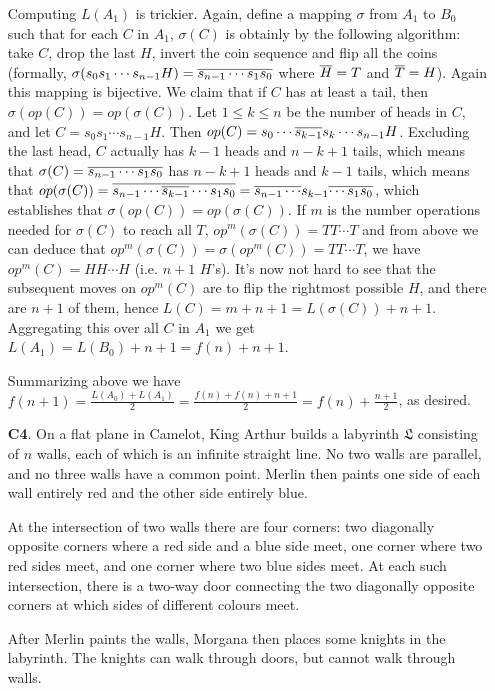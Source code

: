 \documentclass[11pt,a4paper]{article}
\begin{document}
\begin{enumerate}
	Computing $L(A_1)$ is trickier. Again, define a mapping $\sigma$ from $A_1$ to $B_0$ such that for each $C$ in $A_1$, $\sigma(C)$ is obtainly by the following algorithm: take $C$, drop the last $H$, invert the coin sequence and flip all the coins (formally, $\sigma(s_0s_1\cdots s_{n-1}H)=\ol{s_{n-1}\cdots s_1s_0}$ where $\ol{H}=T$ and $\ol{T}=H$). 
	Again this mapping is bijective. 
	We claim that if $C$ has at least a tail, then $\sigma(op(C))=op(\sigma(C))$. 
	Let $1\le k\le n$ be the number of heads in $C$, and let $C=s_0s_1\cdots s_{n-1}H$. 
	Then $op(C)=s_0\cdots \ol{s_{k-1}}s_k\cdots s_{n-1}H$. 
	Excluding the last head, $C$ actually has $k-1$ heads and $n-k+1$ tails, which means that $\sigma(C)=\ol{s_{n-1}\cdots s_1s_0}$ has $n-k+1$ heads and $k-1$ tails, which means that $op(\sigma(C))=\ol{s_{n-1}\cdots\ol{s_{k-1}}\cdots s_1s_0}=\ol{s_{n-1}\cdots}s_{k-1}\ol{\cdots s_1s_0}$, which establishes that $\sigma(op(C))=op(\sigma(C))$. 
	If $m$ is the number operations needed for $\sigma(C)$ to reach all $T$, $op^{m}(\sigma(C))=TT\cdots T$ and from above we can deduce that $op^{m}(\sigma(C))=\sigma(op^{m}(C))=TT\cdots T$, we have $op^{m}(C)=HH\cdots H$ (i.e. $n+1$ $H$'s). 
	It's now not hard to see that the subsequent moves on $op^{m}(C)$ are to flip the rightmost possible $H$, and there are $n+1$ of them, hence $L(C)=m+n+1=L(\sigma(C))+n+1$. 
	Aggregating this over all $C$ in $A_1$ we get $L(A_1)=L(B_0)+n+1=f(n)+n+1$. 
	
	Summarizing above we have $f(n+1)=\frac{L(A_0)+L(A_1)}{2}=\frac{f(n)+f(n)+n+1}{2}=f(n)+\frac{n+1}{2}$, as desired. 
	
	\item [\textbf{C4}.] On a flat plane in Camelot, King Arthur builds a labyrinth $\mathfrak{L}$ consisting of $n$ walls, each of which is an infinite straight line. No two walls are parallel, and no three walls have a common point. Merlin then paints one side of each wall entirely red and the other side entirely blue.
	
	At the intersection of two walls there are four corners: two diagonally opposite corners where a red side and a blue side meet, one corner where two red sides meet, and one corner where two blue sides meet. At each such intersection, there is a two-way door connecting the two diagonally opposite corners at which sides of different colours meet.
	
	After Merlin paints the walls, Morgana then places some knights in the labyrinth. The knights can walk through doors, but cannot walk through walls.
	

\end{enumerate}
\end{document}

